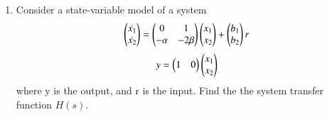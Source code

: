 \begin{enumerate}[label=\thesubsection.\arabic*.,ref=\thesubsection.\theenumi]

\item Consider a state-variable model of a system 
\begin{align}
\begin{pmatrix}\dot{x_{1}}\\\dot{x_{2}}\end{pmatrix}
=
\begin{pmatrix}0&1\\-\alpha&-2\beta\end{pmatrix}\begin{pmatrix}x_{1}\\x_{2}\end{pmatrix}
+
\begin{pmatrix}b_{1}\\b_{2}\end{pmatrix}  r
\end{align}
\begin{align}
y
=
\begin{pmatrix}1&0\end{pmatrix}\begin{pmatrix}x_{1}\\x_{2}\end{pmatrix}
\end{align}
where y is the output, and r is the input.
%
Find the the system transfer function $H(s)$.


\end{enumerate}
